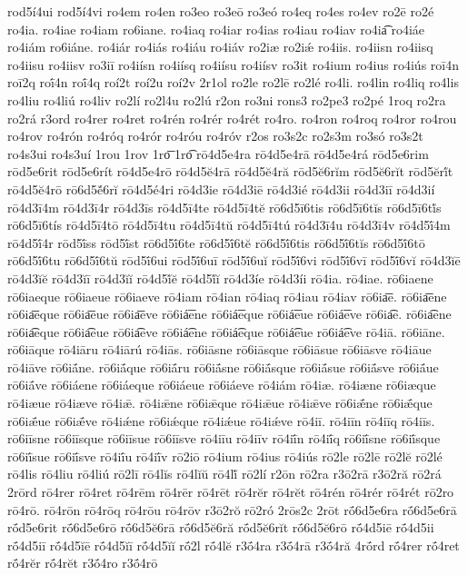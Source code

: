 {rod5í4ui
rod5í4vi
ro4em
ro4en
ro3eo
ro3eō
ro3eó
ro4eq
ro4es
ro4ev
ro2ē
ro2é
ro4ia.
ro4iae
ro4iam
ro6iane.
ro4iaq
ro4iar
ro4ias
ro4iau
ro4iav
ro4ia͡
ro4iáe
ro4iám
ro6iáne.
ro4iár
ro4iás
ro4iáu
ro4iáv
ro2iæ
ro2iǽ
ro4iis.
ro4iisn
ro4iisq
ro4iisu
ro4iisv
ro3iī
ro4iísn
ro4iísq
ro4iísu
ro4iísv
ro3it
ro4ium
ro4ius
ro4iús
roī4n
roī2q
roī́4n
roī́4q
roí2t
roí2u
roí2v
2r1ol
ro2le
ro2lē
ro2lé
ro4li.
ro4lin
ro4liq
ro4lis
ro4liu
ro4liú
ro4liv
ro2lí
ro2l4u
ro2lú
r2on
ro3ni
rons3
ro2pe3
ro2pé
1roq
ro2ra
ro2rá
r3ord
ro4rer
ro4ret
ro4rén
ro4rér
ro4rét
ro4ro.
ro4ron
ro4roq
ro4ror
ro4rou
ro4rov
ro4rón
ro4róq
ro4rór
ro4róu
ro4róv
r2os
ro3s2c
ro2s3m
ro3só
ro3s2t
ro4s3ui
ro4s3uí
1rou
1rov
1ro͞
1ro͡
rō4d5e4ra
rō4d5e4rā
rō4d5e4rá
rōd5e6rim
rōd5e6rit
rōd5e6rít
rō4d5e4rō
rō4d5ĕ4rā
rō4d5ĕ4ră
rōd5ĕ6rĭm
rōd5ĕ6rĭt
rōd5ĕrĭ́t
rō4d5ĕ4rō
rō6d5ĕ́6rĭ
rō4d5é4ri
rō4d3ie
rō4d3iē
rō4d3ié
rō4d3ii
rō4d3iī
rō4d3ií
rō4d3ī4m
rō4d3ī4r
rō4d3īs
rō4d5ī4te
rō4d5ī4tĕ
rō6d5ī6tis
rō6d5ī6tĭs
rō6d5ī6tĭ́s
rō6d5ī6tís
rō4d5ī4tō
rō4d5ī4tu
rō4d5ī4tŭ
rō4d5ī4tú
rō4d3ī4u
rō4d3ī4v
rō4d5ī́4m
rō4d5ī́4r
rōd5ī́ss
rōd5ī́st
rō6d5ī́6te
rō6d5ī́6tĕ
rō6d5ī́6tis
rō6d5ī́6tĭs
rō6d5ī́6tō
rō6d5ī́6tu
rō6d5ī́6tŭ
rōd5ī́6ui
rōd5ī́6uī
rōd5ī́6uĭ
rōd5ī́6vi
rōd5ī́6vī
rōd5ī́6vĭ
rō4d3ĭē
rō4d3ĭĕ
rō4d3ĭī
rō4d3ĭĭ
rō4d5ĭ́ĕ
rō4d5ĭ́ĭ
rō4d3íe
rō4d3íi
rō4ia.
rō4iae.
rō6iaene
rō6iaeque
rō6iaeue
rō6iaeve
rō4iam
rō4ian
rō4iaq
rō4iau
rō4iav
rō6ia͞e.
rō6ia͞ene
rō6ia͞eque
rō6ia͞eue
rō6ia͞eve
rō6iá͞ene
rō6iá͞eque
rō6iá͞eue
rō6iá͞eve
rō6ia͡e.
rō6ia͡ene
rō6ia͡eque
rō6ia͡eue
rō6ia͡eve
rō6iá͡ene
rō6iá͡eque
rō6iá͡eue
rō6iá͡eve
rō4iā.
rō6iāne.
rō6iāque
rō4iāru
rō4iārú
rō4iās.
rō6iāsne
rō6iāsque
rō6iāsue
rō6iāsve
rō4iāue
rō4iāve
rō6iā́ne.
rō6iā́que
rō6iā́ru
rō6iā́sne
rō6iā́sque
rō6iā́sue
rō6iā́sve
rō6iā́ue
rō6iā́ve
rō6iáene
rō6iáeque
rō6iáeue
rō6iáeve
rō4iám
rō4iæ.
rō4iæne
rō6iæque
rō4iæue
rō4iæve
rō4iǣ.
rō4iǣne
rō6iǣque
rō4iǣue
rō4iǣve
rō6iǣ́ne
rō6iǣ́que
rō6iǣ́ue
rō6iǣ́ve
rō4iǽne
rō6iǽque
rō4iǽue
rō4iǽve
rō4iī.
rō4iīn
rō4iīq
rō4iīs.
rō6iīsne
rō6iīsque
rō6iīsue
rō6iīsve
rō4iīu
rō4iīv
rō4iī́n
rō4iī́q
rō6iī́sne
rō6iī́sque
rō6iī́sue
rō6iī́sve
rō4iī́u
rō4iī́v
rō2iō
rō4ium
rō4ius
rō4iús
rō2le
rō2lē
rō2lĕ
rō2lé
rō4lis
rō4liu
rō4liú
rō2lī
rō4lĭs
rō4lĭŭ
rō4lĭ́
rō2lí
r2ōn
rō2ra
r3ō2rā
r3ō2ră
rō2rá
2rōrd
rō4rer
rō4ret
rō4rēm
rō4rēr
rō4rēt
rō4rĕr
rō4rĕt
rō4rén
rō4rér
rō4rét
rō2ro
rō4rō.
rō4rōn
rō4rōq
rō4rōu
rō4rōv
r3ō2rŏ
rō2ró
2rōs2c
2rōt
rṓ6d5e6ra
rṓ6d5e6rā
rṓd5e6rit
rṓ6d5e6rō
rṓ6d5ĕ6rā
rṓ6d5ĕ6ră
rṓd5ĕ6rĭt
rṓ6d5ĕ6rō
rṓ4d5iē
rṓ4d5ii
rṓ4d5iī
rṓ4d5ĭē
rṓ4d5ĭī
rṓ4d5ĭĭ
rṓ2l
rṓ4lĕ
r3ṓ4ra
r3ṓ4rā
r3ṓ4ră
4rṓrd
rṓ4rer
rṓ4ret
rṓ4rĕr
rṓ4rĕt
r3ṓ4ro
r3ṓ4rō
}
